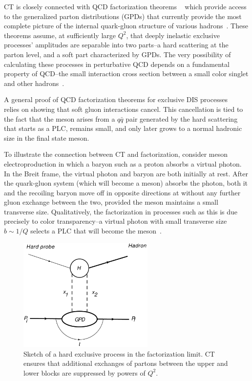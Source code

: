 CT is closely connected with QCD factorization
theorems ~\cite{Brodsky_1994, Collins_1997, Frankfurt_1999, Diehl_1998, Strikman_2000}
which provide access to the generalized parton distributions (GPDs)
that currently provide the most complete picture of the internal
quark-gluon structure of various hadrons~\cite{Ji_1997_Jan, Ji_1997_Jun,
Radyushkin_1996, Radyushkin_1997}.
These theorems assume, at sufficiently large $Q^2$, that deeply inelastic
exclusive processes' amplitudes are separable into two parts--a hard scattering
at the parton level, and a soft part characterized by GPDs.
The very possibility of calculating these processes in perturbative QCD depends
on a fundamental property of QCD--the small interaction cross section
between a small color singlet and other hadrons~\cite{Strikman_2000}.

A general proof of QCD factorization theorems for exclusive DIS processes
~\cite{Collins_1997, Collins_1998} relies on showing that soft gluon
interactions cancel.
This cancellation is tied to the fact that the meson arises from a $q\bar{q}$
pair generated by the hard scattering that starts as a PLC, remains small, and
only later grows to a normal hadronic size in the final state meson.

To illustrate the connection between CT and factorization, consider
meson electroproduction in which a baryon such as a proton absorbs a virtual
photon.
In the Breit frame, the virtual photon and baryon are both initially at rest.
After the quark-gluon system (which will become a meson) absorbs the photon,
both it and the recoiling baryon move off in opposite directions at without any
further gluon exchange between the two,
provided the meson maintains a small transverse size.
Qualitatively, the factorization in processes such as this is due precisely to
color transparency--a virtual photon with small transverse size $b\sim1/Q$
selects a PLC that will become the meson~\cite{Strikman_2000}.

\begin{figure}[H]
    \centering
    \includegraphics[width=0.6\textwidth]{chap2/factorization.pdf}
    \caption[Sketch of a hard exclusive process in the factorization limit.]{
            Sketch of a hard exclusive process in the factorization limit.
            CT ensures that additional exchanges of partons between the upper
            and lower blocks are suppressed by powers of $Q^2$.
    }
    \label{fig:factorization_handbag}
\end{figure}


